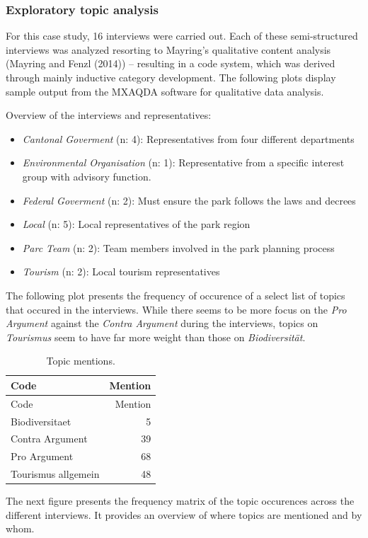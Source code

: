 \documentclass[]{article}
\providecommand{\tightlist}{%
  \setlength{\itemsep}{0pt}\setlength{\parskip}{0pt}}
\begin{document}
\subsubsection{Exploratory topic
analysis}\label{exploratory-topic-analysis}

For this case study, 16 interviews were carried out. Each of these
semi-structured interviews was analyzed resorting to Mayring's
qualitative content analysis (Mayring and Fenzl (2014)) -- resulting in
a code system, which was derived through mainly inductive category
development. The following plots display sample output from the MXAQDA
software for qualitative data analysis.

Overview of the interviews and representatives:

\begin{itemize}
\tightlist
\item
  \emph{Cantonal Goverment} (n: 4): Representatives from four different
  departments
\item
  \emph{Environmental Organisation} (n: 1): Representative from a
  specific interest group with advisory function.
\item
  \emph{Federal Goverment} (n: 2): Must ensure the park follows the laws
  and decrees
\item
  \emph{Local} (n: 5): Local representatives of the park region
\item
  \emph{Parc Team} (n: 2): Team members involved in the park planning
  process
\item
  \emph{Tourism} (n: 2): Local tourism representatives
\end{itemize}

The following plot presents the frequency of occurence of a select list
of topics that occured in the interviews. While there seems to be more
focus on the \emph{Pro Argument} against the \emph{Contra Argument}
during the interviews, topics on \emph{Tourismus} seem to have far more
weight than those on \emph{Biodiversität}.

\begin{longtable}[c]{@{}lr@{}}
\caption{Topic mentions.}\tabularnewline
\toprule
Code & Mention\tabularnewline
\midrule
\endfirsthead
\toprule
Code & Mention\tabularnewline
\midrule
\endhead
Biodiversitaet & 5\tabularnewline
Contra Argument & 39\tabularnewline
Pro Argument & 68\tabularnewline
Tourismus allgemein & 48\tabularnewline
\bottomrule
\end{longtable}

The next figure presents the frequency matrix of the topic occurences
across the different interviews. It provides an overview of where topics
are mentioned and by whom.
\end{document}
